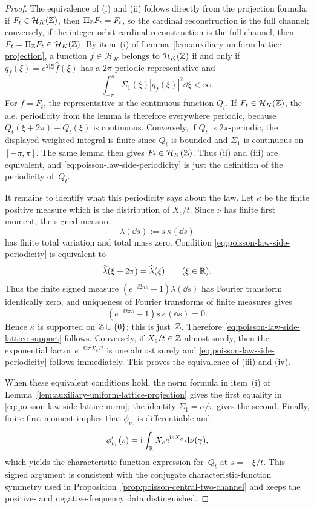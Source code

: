 \begin{proof}
The equivalence of (i) and (ii) follows directly from the projection formula:
if $F_t\in\mathcal H_K(\mathbb{Z})$, then $\Pi_{\mathbb{Z}}F_t=F_t$, so the cardinal
reconstruction is the full channel; conversely, if the integer-orbit cardinal
reconstruction is the full channel, then
$F_t=\Pi_{\mathbb{Z}}F_t\in\mathcal H_K(\mathbb{Z})$.  By item~\textup{(i)} of
Lemma~\ref{lem:auxiliary-uniform-lattice-projection}, a function
$f\in\mathcal H_K$ belongs to $\mathcal H_K(\mathbb{Z})$ if and only if
$q_f(\xi)=e^{2|\xi|}\widehat f(\xi)$ has a $2\pi$-periodic representative
and
\[
\int_{-\pi}^{\pi}\Sigma_1(\xi)|q_f(\xi)|^2\dd\xi<\infty .
\]
For $f=F_t$, the representative is the continuous function $Q_t$.  If
$F_t\in\mathcal H_K(\mathbb{Z})$, the a.e. periodicity from the lemma is therefore
everywhere periodic, because $Q_t(\xi+2\pi)-Q_t(\xi)$ is continuous.  Conversely,
if $Q_t$ is $2\pi$-periodic, the displayed weighted integral is finite since
$Q_t$ is bounded and $\Sigma_1$ is continuous on $[-\pi,\pi]$.  The same lemma
then gives $F_t\in\mathcal H_K(\mathbb{Z})$.  Thus (ii) and (iii) are equivalent, and
\eqref{eq:poisson-law-side-periodicity} is just the definition of the
periodicity of~$Q_t$.

It remains to identify what this periodicity says about the law.  Let
$\kappa$ be the finite positive measure which is the distribution of
$X_c/t$.  Since $\nu$ has finite first moment, the signed measure
\[
\lambda(\dd s):=s\,\kappa(\dd s)
\]
has finite total variation and total mass zero.  Condition
\eqref{eq:poisson-law-side-periodicity} is equivalent to
\[
\widehat\lambda(\xi+2\pi)=\widehat\lambda(\xi)
\qquad(\xi\in\mathbb{R}).
\]
Thus the finite signed measure $(e^{-\ii2\pi s}-1)\lambda(\dd s)$ has
Fourier transform identically zero, and uniqueness of Fourier transforms of
finite measures gives
\[
(e^{-\ii2\pi s}-1)s\,\kappa(\dd s)=0.
\]
Hence $\kappa$ is supported on $\mathbb{Z}\cup\{0\}$; this is just~$\mathbb{Z}$.  Therefore
\eqref{eq:poisson-law-side-lattice-support} follows.  Conversely, if
$X_c/t\in\mathbb{Z}$ almost surely, then the exponential factor
$e^{-\ii2\pi X_c/t}$ is one almost surely and
\eqref{eq:poisson-law-side-periodicity} follows immediately.  This proves the
equivalence of (iii) and (iv).

When these equivalent conditions hold, the norm formula in item~\textup{(i)}
of Lemma~\ref{lem:auxiliary-uniform-lattice-projection} gives the first equality
in \eqref{eq:poisson-law-side-lattice-norm}; the identity
$\Sigma_1=\sigma/\pi$ gives the second.  Finally, finite first moment implies
that $\phi_{\nu_c}$ is differentiable and
\[
\phi_{\nu_c}'(s)=\mathrm{i}\int_{\mathbb{R}}X_c e^{\mathrm{i} sX_c}\,\mathrm{d}\nu(\gamma),
\]
which yields the characteristic-function expression for~$Q_t$ at
$s=-\xi/t$.  This signed argument is consistent with the conjugate
characteristic-function symmetry used in
Proposition~\ref{prop:poisson-central-two-channel} and keeps the
positive- and negative-frequency data distinguished.
\end{proof}
